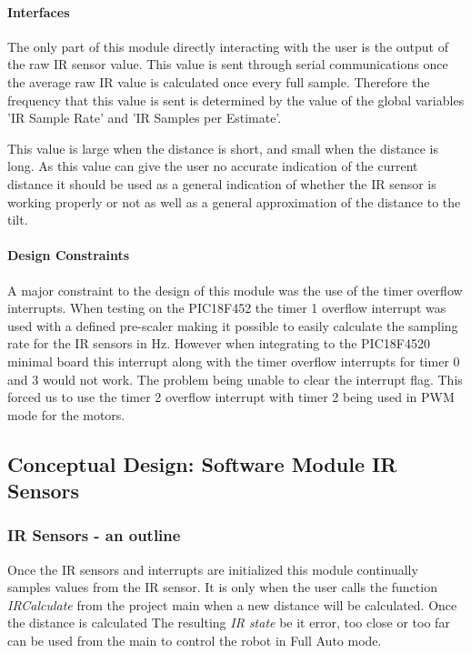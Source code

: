 \documentclass{article}
\begin{document}
\paragraph{Interfaces}

The only part of this module directly interacting with the user is the output of the raw IR sensor value. This value is sent through serial communications once the average raw IR value is calculated once every full sample. Therefore the frequency that this value is sent is determined by the value of the global variables 'IR Sample Rate' and 'IR Samples per Estimate'. 

This value is large when the distance is short, and small when the distance is long. As this value can give the user no accurate indication of the current distance it should be used as a general indication of whether the IR sensor is working properly or not as well as a general approximation of the distance to the tilt.
 
\paragraph{Design Constraints}
A major constraint to the design of this module was the use of the timer overflow interrupts. When testing on the PIC18F452 the timer 1 overflow interrupt was used with a defined pre-scaler making it possible to easily calculate the sampling rate for the IR sensors in Hz. However when integrating to the PIC18F4520 minimal board this interrupt along with the timer overflow interrupts for timer 0 and 3 would not work. The problem being unable to clear the interrupt flag. This forced us to use the timer 2 overflow interrupt with timer 2 being used in PWM mode for the motors.   

\subsection{Conceptual Design: Software Module IR Sensors}


\subsubsection{IR Sensors - an outline}
Once the IR sensors and interrupts are initialized this module continually samples values from the IR sensor. It is only when the user calls the function \textit{IR\textunderscore  Calculate} from the project main when a new distance will be calculated. Once the distance is calculated The resulting \textit{IR state} be it error, too close or too far can be used from the main to control the robot in Full Auto mode.
\end{document}
